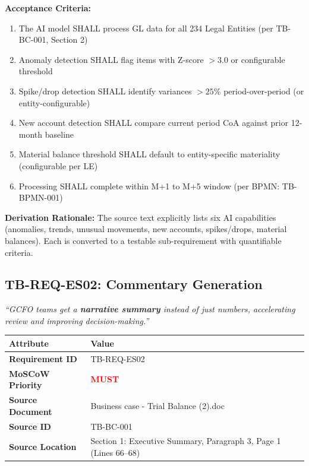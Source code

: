\vspace{0.5em}
\textbf{Acceptance Criteria:}

\begin{tcolorbox}[colback=sapamber!5,colframe=sapamber!70,title=Measurable Acceptance Criteria]
\begin{enumerate}[label=AC-ES01-\arabic*:,leftmargin=*]
    \item The AI model SHALL process GL data for all 234 Legal Entities 
          (per TB-BC-001, Section 2)
    \item Anomaly detection SHALL flag items with Z-score $> 3.0$ or configurable threshold
    \item Spike/drop detection SHALL identify variances $> 25\%$ period-over-period 
          (or entity-configurable)
    \item New account detection SHALL compare current period CoA against prior 
          12-month baseline
    \item Material balance threshold SHALL default to entity-specific materiality 
          (configurable per LE)
    \item Processing SHALL complete within M+1 to M+5 window (per BPMN: TB-BPMN-001)
\end{enumerate}
\end{tcolorbox}

\textbf{Derivation Rationale:} The source text explicitly lists six AI capabilities 
(anomalies, trends, unusual movements, new accounts, spikes/drops, material balances). 
Each is converted to a testable sub-requirement with quantifiable criteria.

\subsection{TB-REQ-ES02: Commentary Generation}
\label{req:tb-req-es02}

\begin{tcolorbox}[colback=sourcegreen!5,colframe=sourcegreen!70,title=Source Quotation]
\textit{``GCFO teams get a \textbf{narrative summary} instead of just numbers, 
accelerating review and improving decision-making.''}
\end{tcolorbox}

\begin{tabularx}{\textwidth}{@{}lX@{}}
\toprule
\textbf{Attribute} & \textbf{Value} \\
\midrule
\textbf{Requirement ID} & TB-REQ-ES02 \\
\textbf{MoSCoW Priority} & \textcolor{red}{\textbf{MUST}} \\
\textbf{Source Document} & Business case - Trial Balance (2).doc \\
\textbf{Source ID} & TB-BC-001 \\
\textbf{Source Location} & Section 1: Executive Summary, Paragraph 3, Page 1 (Lines 66--68) \\
\bottomrule
\end{tabularx}

